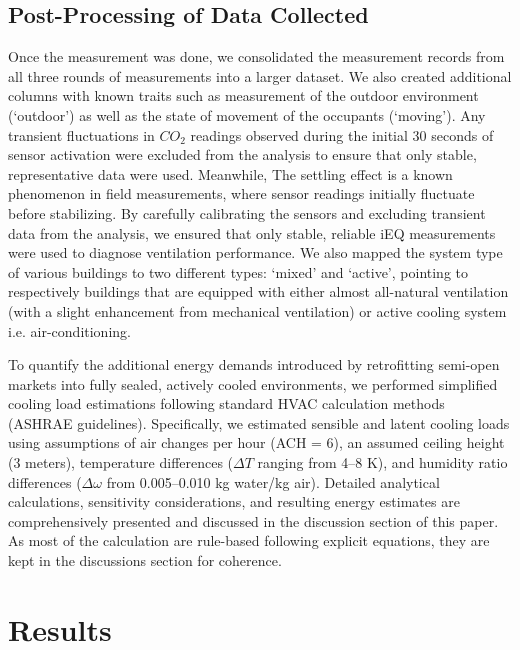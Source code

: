 \documentclass[preprint,12pt]{elsarticle}
\begin{document}
\subsection{Post-Processing of Data Collected}
    Once the measurement was done, we consolidated the measurement records from all three rounds of measurements into a larger dataset. We also created additional columns with known traits such as measurement of the outdoor environment (`outdoor') as well as the state of movement of the occupants (`moving'). Any transient fluctuations in $CO_2$ readings observed during the initial 30 seconds of sensor activation were excluded from the analysis to ensure that only stable, representative data were used. Meanwhile, The settling effect is a known phenomenon in field measurements, where sensor readings initially fluctuate before stabilizing\cite{fradenHandbookModernSensors2016}. By carefully calibrating the sensors and excluding transient data from the analysis, we ensured that only stable, reliable iEQ measurements were used to diagnose ventilation performance. We also mapped the system type of various buildings to two different types: `mixed' and `active', pointing to respectively buildings that are equipped with either almost all-natural ventilation (with a slight enhancement from mechanical ventilation) or active cooling system i.e. air-conditioning. 
    
    To quantify the additional energy demands introduced by retrofitting semi-open markets into fully sealed, actively cooled environments, we performed simplified cooling load estimations following standard HVAC calculation methods (ASHRAE guidelines). Specifically, we estimated sensible and latent cooling loads using assumptions of air changes per hour (ACH = 6), an assumed ceiling height (3 meters), temperature differences ($\Delta T$ ranging from 4–8 K), and humidity ratio differences ($\Delta \omega $ from 0.005–0.010 kg water/kg air). Detailed analytical calculations, sensitivity considerations, and resulting energy estimates are comprehensively presented and discussed in the discussion section of this paper. As most of the calculation are rule-based following explicit equations, they are kept in the discussions section for coherence.

\section{Results}
\end{document}
